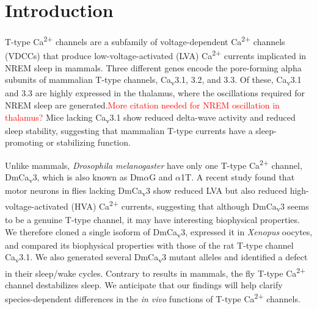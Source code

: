 \section*{Introduction}

T-type Ca\textsuperscript{2+} channels are a subfamily of voltage-dependent Ca\textsuperscript{2+} channels (VDCCs) that produce low-voltage-activated (LVA) Ca\textsuperscript{2+} currents implicated in NREM sleep in mammals\cite{Lee:2004ey}.
Three different genes encode the pore-forming alpha subunits of mammalian T-type channels, Ca\textsubscript{v}3.1, 3.2, and 3.3. Of these, Ca\textsubscript{v}3.1 and 3.3 are highly expressed in the thalamus, where the oscillations required for NREM sleep are generated\cite{PerezReyes:1998gn}.\textcolor{red}{More citation needed for NREM oscillation in thalamus?}
Mice lacking Ca\textsubscript{v}3.1 show reduced delta-wave activity and reduced sleep stability, suggesting that mammalian T-type currents have a sleep-promoting or stabilizing function\cite{Lee:2004ey}.

Unlike mammals, \emph{Drosophila melanogaster} have only one T-type Ca\textsuperscript{2+} channel, DmCa\textsubscript{v}3, which is also known as Dm$\alpha$G and $\alpha$1T.
A recent study found that motor neurons in flies lacking DmCa\textsubscript{v}3 show reduced LVA but also reduced high-voltage-activated (HVA) Ca\textsuperscript{2+} currents, suggesting that although DmCa\textsubscript{v}3 seems to be a genuine T-type channel, it may have interesting biophysical properties\cite{Ryglewski:2012jk}.
We therefore cloned a single isoform of DmCa\textsubscript{v}3,  expressed it in \emph{Xenopus} oocytes, and compared its biophysical properties with those of the rat T-type channel Ca\textsubscript{v}3.1.
We also generated several DmCa\textsubscript{v}3 mutant alleles and identified a defect in their sleep/wake cycles. Contrary to results in mammals, the fly T-type Ca\textsuperscript{2+} channel destabilizes sleep.
We anticipate that our findings will help clarify species-dependent differences in the \emph{in vivo} functions of T-type Ca\textsuperscript{2+} channels.